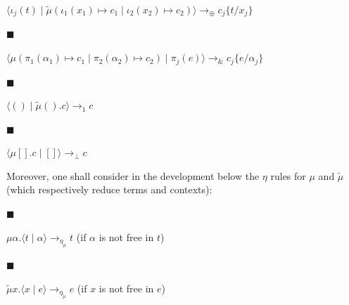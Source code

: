 $\langle\iota_{j}(t)\mid\tilde{\mu}(\iota_{1}(x_{1})\mapsto c_{1}\mid\iota_{2}(x_{2})\mapsto c_{2})\rangle\longrightarrow_{\oplus}c_{j}\{t/x_{j}\}$\par
 
 
 
\par\noindent  $\blacksquare$ 
 
$\langle\mu(\pi_{1}(\alpha_{1})\mapsto c_{1}\mid\pi_{2}(\alpha_{2})\mapsto c_{2})\mid\pi_{j}(e)\rangle\longrightarrow_{\binampersand}c_{j}\{e/\alpha_{j}\}$\par
 
 
 
\par\noindent  $\blacksquare$ 
 
$\langle()\mid\tilde{\mu}().c\rangle\longrightarrow_{1}c$\par
 
 
 
\par\noindent  $\blacksquare$ 
 
$\langle\mu[].c\mid[]\rangle\longrightarrow_{\bot}c$\par
 
 
  
 
 
Moreover, one shall consider in the development below the $\eta$ rules for $\mu$ and $\tilde{\mu}$ (which respectively reduce terms and contexts):\par
  
\par\noindent  $\blacksquare$ 
 
${\mu\alpha.\langle t\mid\alpha\rangle}\longrightarrow_{\eta_{\mu}}t$ (if $\alpha$ is not free in $t$)\par
 
 
 
\par\noindent  $\blacksquare$ 
 
${\tilde{\mu}x.\langle x\mid e\rangle}\longrightarrow_{\eta_{\tilde{\mu}}}e$ (if $x$ is not free in $e$)\par
 
 
  
 
 

